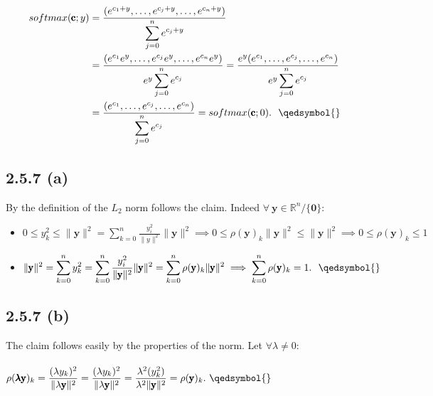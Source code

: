\documentclass{exam}
\begin{document}
\begin{equation*}
    \begin{aligned}
        \displaystyle softmax(\pmb{\text{c}};y) &= \frac{(e^{c_1 + y}, \ldots ,e^{c_j + y}, \ldots ,e^{c_n + y} )}{\displaystyle\sum^{n}_{j = 0 }e^{c_j + y}} \\
                    &=\frac{(e^{c_1} e^{y}, \ldots ,e^{c_j} e^{y}, \ldots ,e^{c_n} e^{y} )}{e^{y}\displaystyle\sum^{n}_{j = 0 }e^{c_j}} = \frac{e^{y}(e^{c_1} , \ldots ,e^{c_j}, \ldots ,e^{c_n})}{e^{y}\displaystyle\sum^{n}_{j = 0 }e^{c_j}} \\
                    &= \frac{(e^{c_1}, \ldots ,e^{c_j}, \ldots ,e^{c_n} )}{\displaystyle\sum^{n}_{j = 0 }e^{c_j}} = softmax(\pmb{\text{c}};0).\ \ \qedsymbol{}
    \end{aligned}    
\end{equation*}

\subsection*{2.5.7 (a)}
By the definition of the $L_2$ norm follows the claim. Indeed $\forall \ \pmb{\text{y}} \in \mathbb{R}^n/\{\pmb{0}\}$:
\begin{itemize}
    \item $\displaystyle 0 \leq y^2_{k} \leq \lVert \pmb{\text{y}} \rVert^{2} =  \sum^{n}_{k = 0} \frac{y^2_i}{\lVert y \rVert^{2} } \lVert \pmb{\text{y}} \rVert^{2} \implies 0 \leq \rho(\pmb{\text{y}})_{k} \lVert \pmb{\text{y}} \rVert^{2} \leq \lVert \pmb{\text{y}} \rVert^{2} \implies 0 \leq \rho(\pmb{\text{y}})_{k} \leq 1$
    \item $\displaystyle\lVert \pmb{\text{y}} \rVert^{2} = \sum^{n}_{k = 0} y^2_{k} =  \sum^{n}_{k = 0} \frac{y^2_i}{\lVert \pmb{\text{y}} \rVert^{2} } \lVert \pmb{\text{y}} \rVert^{2} = \sum^{n}_{k = 0} \rho(\pmb{\text{y}})_{k} \lVert \pmb{\text{y}} \rVert^{2} \implies \sum^{n}_{k = 0} \rho(\pmb{\text{y}})_{k} = 1.  \ \ \qedsymbol{}$
\end{itemize} 

\subsection*{2.5.7 (b)}
The claim follows easily by the properties of the norm. Let $\forall \lambda \neq 0$:\\
\\
$\displaystyle \rho(\pmb{ \lambda \text{y}})_{k} = \displaystyle\frac{(\lambda y_{k})^2}{\lVert \lambda \pmb{\text{y}} \rVert^{2} } = \displaystyle\frac{(\lambda y_{k})^2}{\lVert \lambda \pmb{\text{y}} \rVert^{2} } = \displaystyle\frac{\lambda^2 (y_{k}^2)}{\lambda^2 \lVert \pmb{\text{y}} \rVert^{2} } = \rho(\pmb{ \text{y}})_{k}. \ \qedsymbol{}$
\end{document}

